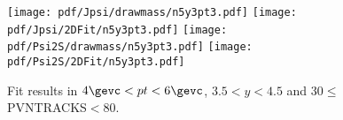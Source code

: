 \begin{figure}[H]
\begin{center}
\texttt{[image: pdf/Jpsi/drawmass/n5y3pt3.pdf]}
\texttt{[image: pdf/Jpsi/2DFit/n5y3pt3.pdf]}
\vspace*{-0.5cm}
\texttt{[image: pdf/Psi2S/drawmass/n5y3pt3.pdf]}
\texttt{[image: pdf/Psi2S/2DFit/n5y3pt3.pdf]}
\vspace*{-0.5cm}
\end{center}
\caption{Fit results in $4\gevc<pt<6\gevc$, $3.5<y<4.5$ and 30$\leq$PVNTRACKS$<$80.}
\label{Fitn5y3pt3}
\end{figure}
